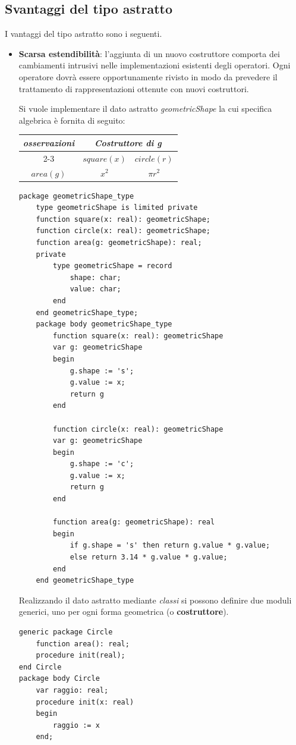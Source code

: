 \documentclass[12pt]{report}
\begin{document}
			\subsection{Svantaggi del tipo astratto}
			I vantaggi del tipo astratto sono i seguenti.
			\begin{itemize}
				\item \textbf{Scarsa estendibilità}: l'aggiunta di un nuovo costruttore comporta dei cambiamenti intrusivi nelle implementazioni esistenti degli operatori. Ogni operatore dovrà essere opportunamente rivisto in modo da prevedere il trattamento di rappresentazioni ottenute con nuovi costruttori.
				\begin{example}{}{}
					Si vuole implementare il dato astratto \textit{geometricShape} la cui specifica algebrica è fornita di seguito:
					\begin{center}
					\begin{tabular}{|c|c|c|}
						\hline
						\multirow{2}{*}{\textit{\textbf{osservazioni}}} & \multicolumn{2}{c|}{\textit{\textbf{Costruttore di g}}} \\ \cline{2-3}
						& $square(x)$ & $circle(r)$ \\ \hline
						$area(g)$ & $x^2$ & $\pi r^2$ \\ \hline
					\end{tabular}
					\end{center}
					\begin{lstlisting}[style=adastyle]
package geometricShape_type
	type geometricShape is limited private
	function square(x: real): geometricShape;
	function circle(x: real): geometricShape;
	function area(g: geometricShape): real;
	private
		type geometricShape = record
			shape: char;
			value: char;
		end
	end geometricShape_type;
	package body geometricShape_type
		function square(x: real): geometricShape
		var g: geometricShape
		begin
			g.shape := 's';
			g.value := x;
			return g
		end

		function circle(x: real): geometricShape
		var g: geometricShape
		begin
			g.shape := 'c';
			g.value := x;
			return g
		end

		function area(g: geometricShape): real
		begin
			if g.shape = 's' then return g.value * g.value;
			else return 3.14 * g.value * g.value;
		end
	end geometricShape_type	\end{lstlisting}
					Realizzando il dato astratto mediante \textit{classi} si possono definire due moduli generici, uno per ogni forma geometrica (o \textbf{costruttore}).
					\begin{lstlisting}[style=adastyle]
generic package Circle
	function area(): real;
	procedure init(real);
end Circle
package body Circle
	var raggio: real;
	procedure init(x: real)
	begin
		raggio := x
	end;


\end{lstlisting}
\end{example}
\end{itemize}
\end{document}
